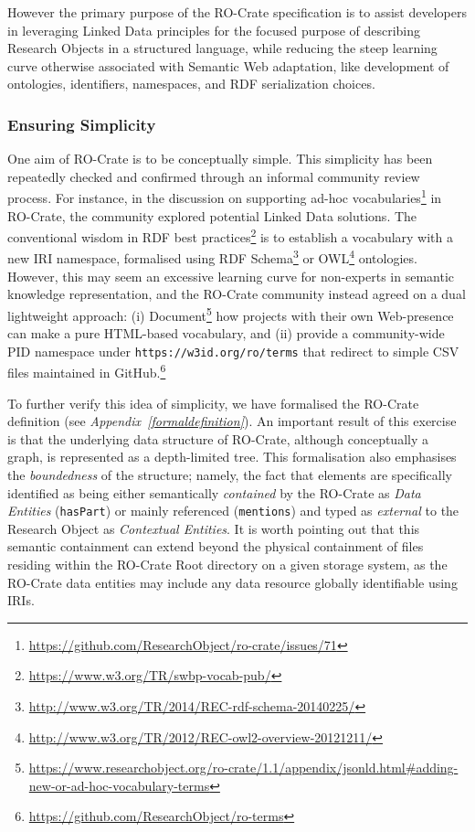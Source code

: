 However the primary purpose of the RO-Crate specification is to assist
developers in leveraging Linked Data principles for the focused purpose
of describing Research Objects in a structured language, while reducing
the steep learning curve otherwise associated with Semantic Web
adaptation, like development of ontologies, identifiers, namespaces, and
RDF serialization choices.

\subsubsection{Ensuring Simplicity}\label{ch5:simplicity}

One aim of RO-Crate is to be conceptually simple. This simplicity has
been repeatedly checked and confirmed through an informal community
review process. For instance, in the discussion on supporting ad-hoc
vocabularies\footnote{\url{https://github.com/ResearchObject/ro-crate/issues/71}} in
RO-Crate, the community explored potential Linked Data solutions. The
conventional wisdom in RDF best
practices\footnote{\url{https://www.w3.org/TR/swbp-vocab-pub/}} is to establish a
vocabulary with a new IRI namespace, formalised using RDF
Schema\footnote{\url{http://www.w3.org/TR/2014/REC-rdf-schema-20140225/}} or
OWL\footnote{\url{http://www.w3.org/TR/2012/REC-owl2-overview-20121211/}}
ontologies. However, this may seem an excessive learning curve for
non-experts in semantic knowledge representation, and the RO-Crate
community instead agreed on a dual lightweight approach: (i)
Document\footnote{\url{https://www.researchobject.org/ro-crate/1.1/appendix/jsonld.html\#adding-new-or-ad-hoc-vocabulary-terms}}
how projects with their own Web-presence can make a pure HTML-based
vocabulary, and (ii) provide a community-wide PID namespace under
\texttt{https://w3id.org/ro/terms} that redirect to simple CSV files
maintained in GitHub.\footnote{\url{https://github.com/ResearchObject/ro-terms}}

To further verify this idea of simplicity, we have formalised the
RO-Crate definition (see \textit{Appendix~\vref{formaldefinition}}). An
important result of this exercise is that the underlying data structure
of RO-Crate, although conceptually a graph, is represented as a
depth-limited tree. This formalisation also emphasises the
\textit{boundedness} of the structure; namely, the fact that elements are
specifically identified as being either semantically \textit{contained} by the
RO-Crate as \textit{Data Entities} (\texttt{hasPart}) or mainly referenced
(\texttt{mentions}) and typed as \textit{external} to the Research Object as
\textit{Contextual Entities}. It is worth pointing out that this semantic
containment can extend beyond the physical containment of files
residing within the RO-Crate Root directory on a given storage system,
as the RO-Crate data entities may include any data resource globally
identifiable using IRIs.

